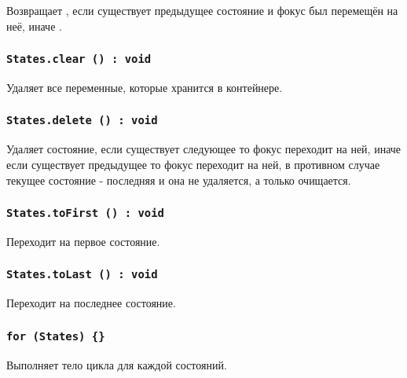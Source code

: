 Возвращает \true, если существует предыдущее состояние и фокус был перемещён на неё, иначе \false.

\subsubsection{\texttt{States.clear () : void}}

Удаляет все переменные, которые хранится в контейнере.

\subsubsection{\texttt{States.delete () : void}}

Удаляет состояние, если существует следующее то фокус переходит на ней, иначе если существует предыдущее то фокус переходит на ней, в противном случае текущее состояние - последняя и она не удаляется, а только очищается.

\subsubsection{\texttt{States.toFirst () : void}}

Переходит на первое состояние.

\subsubsection{\texttt{States.toLast () : void}}

Переходит на последнее состояние.

\subsubsection{\texttt{for (States) \{\}}}

Выполняет тело цикла для каждой состояний.

